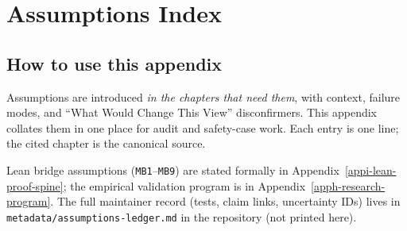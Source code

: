 \chapter{Assumptions Index}
\label{appe-assumptions}

\section{How to use this appendix}

Assumptions are introduced \emph{in the chapters that need them}, with context, failure modes, and ``What Would Change This View'' disconfirmers.
This appendix collates them in one place for audit and safety-case work.
Each entry is one line; the cited chapter is the canonical source.

Lean bridge assumptions (\texttt{MB1}--\texttt{MB9}) are stated formally in Appendix~\ref{appi-lean-proof-spine}; the empirical validation program is in Appendix~\ref{apph-research-program}.
The full maintainer record (tests, claim links, uncertainty IDs) lives in \texttt{metadata/assumptions-ledger.md} in the repository (not printed here).


